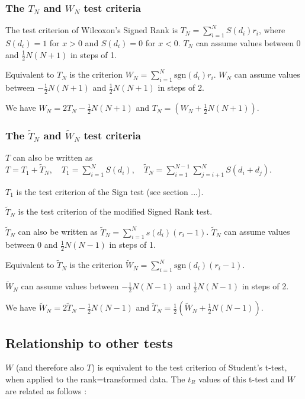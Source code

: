 \subsubsection{The $T_N$ and $W_N$ test criteria}
The test criterion of Wilcoxon's Signed Rank is $T_N=\sum_{i=1}^N S(d_i)r_i$, where $S(d_i)=1$ for $x>0$ and $S(d_i)=0$ for $x<0$.
$T_N$ can assume values between 0 and $\tfrac{1}{2}N(N+1)$ in steps of 1.

Equivalent to $T_N$ is the criterion $W_N=\sum_{i=1}^N \text{sgn}(d_i)r_i$. $W_N$ can assume values between $-\tfrac{1}{2}N(N+1)$ and $\tfrac{1}{2}N(N+1)$ in steps of 2. 

We have $W_N=2T_N-\tfrac{1}{2}N(N+1)$ and $T_N=(W_N+\tfrac{1}{2}N(N+1))$.




\subsubsection{The $\widetilde{T}_N$ and $\widetilde{W}_N$ test criteria}
$T$ can also be written as $T=T_1+\widetilde{T}_N, \quad T_1=\sum_{i=1}^N S(d_i), \quad \widetilde{T}_N=\sum_{i=1}^{N-1} \sum_{j=i+1}^N S(d_i+d_j)$.

$T_1$ is the test criterion of the Sign test (see section ...).

$\widetilde{T}_N$ is the test criterion of the modified Signed Rank test.

$\widetilde{T}_N$ can also be written as $\widetilde{T}_N=\sum_{i=1}^N s(d_i) (r_i - 1)$. 
$\widetilde{T}_N$ can assume values between 0 and $\tfrac{1}{2}N(N-1)$ in steps of 1.

Equivalent to $\widetilde{T}_N$ is the criterion $\widetilde{W}_N=\sum_{i=1}^N \text{sgn}(d_i)(r_i - 1)$. 

$\widetilde{W}_N$ can assume values between $-\tfrac{1}{2}N(N-1)$ and $\tfrac{1}{2}N(N-1)$ in steps of 2. 

We have $\widetilde{W}_N=2\widetilde{T}_N-\tfrac{1}{2}N(N-1)$ and $\widetilde{T}_N=\tfrac{1}{2}(\widetilde{W}_N+\tfrac{1}{2}N(N-1))$.



\vspace{2cm}

\subsection{Relationship to other tests}
$W$ (and therefore also $T$) is equivalent to the test criterion of Student's t-test, when applied to the rank=transformed data. The $t_R$ values of this t-test and $W$ are related as follows \citep{conover1981}:

